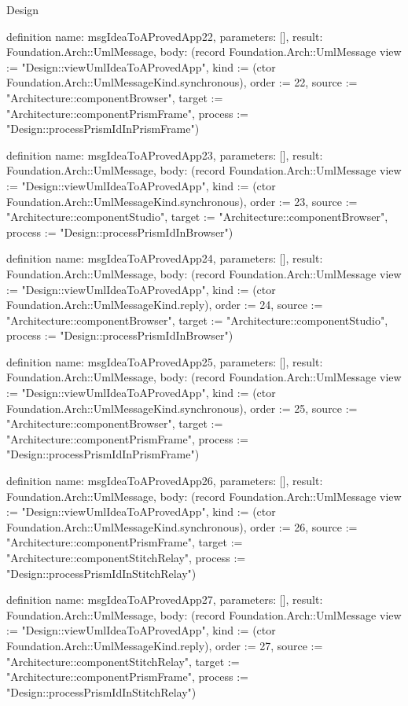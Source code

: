 \begin{lexlean}{Design}
\begin{semanticmodule}
definition{
  name: msgIdeaToAProvedApp22,
  parameters: [],
  result: Foundation.Arch::UmlMessage,
  body: (record Foundation.Arch::UmlMessage {view := "Design::viewUmlIdeaToAProvedApp", kind := (ctor Foundation.Arch::UmlMessageKind.synchronous), order := 22, source := "Architecture::componentBrowser", target := "Architecture::componentPrismFrame", process := "Design::processPrismIdInPrismFrame"})
}

definition{
  name: msgIdeaToAProvedApp23,
  parameters: [],
  result: Foundation.Arch::UmlMessage,
  body: (record Foundation.Arch::UmlMessage {view := "Design::viewUmlIdeaToAProvedApp", kind := (ctor Foundation.Arch::UmlMessageKind.synchronous), order := 23, source := "Architecture::componentStudio", target := "Architecture::componentBrowser", process := "Design::processPrismIdInBrowser"})
}

definition{
  name: msgIdeaToAProvedApp24,
  parameters: [],
  result: Foundation.Arch::UmlMessage,
  body: (record Foundation.Arch::UmlMessage {view := "Design::viewUmlIdeaToAProvedApp", kind := (ctor Foundation.Arch::UmlMessageKind.reply), order := 24, source := "Architecture::componentBrowser", target := "Architecture::componentStudio", process := "Design::processPrismIdInBrowser"})
}

definition{
  name: msgIdeaToAProvedApp25,
  parameters: [],
  result: Foundation.Arch::UmlMessage,
  body: (record Foundation.Arch::UmlMessage {view := "Design::viewUmlIdeaToAProvedApp", kind := (ctor Foundation.Arch::UmlMessageKind.synchronous), order := 25, source := "Architecture::componentBrowser", target := "Architecture::componentPrismFrame", process := "Design::processPrismIdInPrismFrame"})
}

definition{
  name: msgIdeaToAProvedApp26,
  parameters: [],
  result: Foundation.Arch::UmlMessage,
  body: (record Foundation.Arch::UmlMessage {view := "Design::viewUmlIdeaToAProvedApp", kind := (ctor Foundation.Arch::UmlMessageKind.synchronous), order := 26, source := "Architecture::componentPrismFrame", target := "Architecture::componentStitchRelay", process := "Design::processPrismIdInStitchRelay"})
}

definition{
  name: msgIdeaToAProvedApp27,
  parameters: [],
  result: Foundation.Arch::UmlMessage,
  body: (record Foundation.Arch::UmlMessage {view := "Design::viewUmlIdeaToAProvedApp", kind := (ctor Foundation.Arch::UmlMessageKind.reply), order := 27, source := "Architecture::componentStitchRelay", target := "Architecture::componentPrismFrame", process := "Design::processPrismIdInStitchRelay"})
}


\end{semanticmodule}
\end{lexlean}
